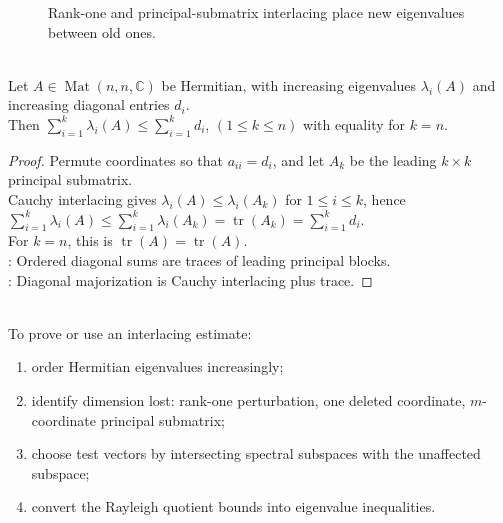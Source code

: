 \begin{figure}[H]
  \centering
  
  \caption{Rank-one and principal-submatrix interlacing place new eigenvalues between old ones.}
  \label{fig:eigenvalue-interlacing-ladder}
\end{figure}

\begin{theorem} \label{thm:schur-majorization-eigenvalues-by-diagonal} \\
Let $A\in\operatorname{Mat}(n,n,\mathbb{C})$ be Hermitian, with increasing eigenvalues $\lambda_i(A)$ and increasing diagonal entries $d_i$.\\
Then $\sum\limits_{i=1}^{k}\lambda_i(A)\leq \sum\limits_{i=1}^{k}d_i$, $(1\leq k\leq n)$ with equality for $k=n$.
\begin{proof}
Permute coordinates so that $a_{ii}=d_i$, and let $A_k$ be the leading $k\times k$ principal submatrix.\\
Cauchy interlacing gives $\lambda_i(A)\leq\lambda_i(A_k)$ for $1\leq i\leq k$, hence $\sum\limits_{i=1}^{k}\lambda_i(A)\leq\sum\limits_{i=1}^{k}\lambda_i(A_k)=\operatorname{tr}(A_k)=\sum\limits_{i=1}^{k}d_i$.\\
For $k=n$, this is $\operatorname{tr}(A)=\operatorname{tr}(A)$.\\
: Ordered diagonal sums are traces of leading principal blocks.\\
: Diagonal majorization is Cauchy interlacing plus trace.
\end{proof}
\end{theorem}

\begin{method} \label{meth:eigenvalue-interlacing-method} \\
To prove or use an interlacing estimate:
\begin{enumerate}[label=(\roman*)]
\setlength{\itemsep}{0pt}
\item order Hermitian eigenvalues increasingly;
\item identify dimension lost: rank-one perturbation, one deleted coordinate, $m$-coordinate principal submatrix;
\item choose test vectors by intersecting spectral subspaces with the unaffected subspace;
\item convert the Rayleigh quotient bounds into eigenvalue inequalities.
\end{enumerate}
\end{method}
